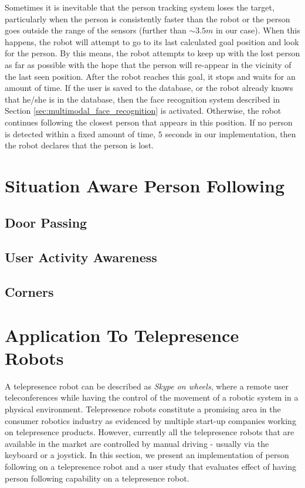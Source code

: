 Sometimes it is inevitable that the person tracking system loses the target, particularly when the person is consistently faster than the robot or the person goes outside the range of the sensors (further than $\sim3.5m$ in our case). When this happens, the robot will attempt to go to its last calculated goal position and look for the person. By this means, the robot attempts to keep up with the lost person as far as possible with the hope that the person will re-appear in the vicinity of the last seen position. After the robot reaches this goal, it stops and waits for an amount of time. If the user is saved to the database, or the robot already knows that he/she is in the database, then the face recognition system described in Section \ref{sec:multimodal_face_recognition} is activated. Otherwise, the robot continues following the closest person that appears in this position. If no person is detected within a fixed amount of time, $5$ seconds in our implementation, then the robot declares that the person is lost.


\section{Situation Aware Person Following}
\label{sec:following_situation_aware}

\subsection{Door Passing}

\subsection{User Activity Awareness}

\subsection{Corners}


\section{Application To Telepresence Robots}
\label{sec:following_application_to_telepresence}

A telepresence robot can be described as \textit{Skype on wheels}, where a remote user teleconferences while having the control of the movement of a robotic system in a physical environment. Telepresence robots constitute a promising area in the consumer robotics industry as evidenced by multiple start-up companies working on telepresence products. However, currently all the telepresence robots that are available in the market are controlled by manual driving - usually via the keyboard or a joystick. In this section, we present an implementation of person following on a telepresence robot and a user study that evaluates effect of having person following capability on a telepresence robot.

